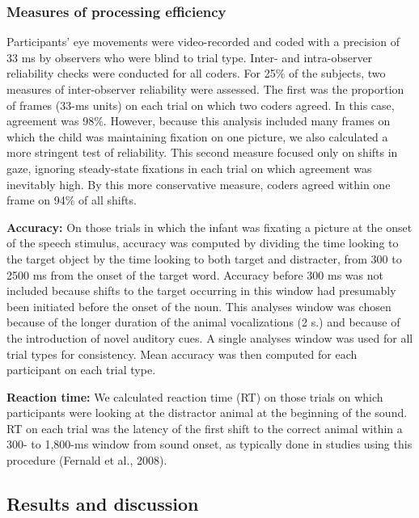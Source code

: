 \documentclass[english,floatsintext,man]{apa6}
\theoremstyle{definition}
\theoremstyle{definition}
\theoremstyle{definition}
\theoremstyle{remark}
\begin{document}
\subsubsection{Measures of processing
efficiency}\label{measures-of-processing-efficiency}

Participants' eye movements were video-recorded and coded with a
precision of 33 ms by observers who were blind to trial type. Inter- and
intra-observer reliability checks were conducted for all coders. For
25\% of the subjects, two measures of inter-observer reliability were
assessed. The first was the proportion of frames (33-ms units) on each
trial on which two coders agreed. In this case, agreement was 98\%.
However, because this analysis included many frames on which the child
was maintaining fixation on one picture, we also calculated a more
stringent test of reliability. This second measure focused only on
shifts in gaze, ignoring steady-state fixations in each trial on which
agreement was inevitably high. By this more conservative measure, coders
agreed within one frame on 94\% of all shifts.

\textbf{Accuracy:} On those trials in which the infant was fixating a
picture at the onset of the speech stimulus, accuracy was computed by
dividing the time looking to the target object by the time looking to
both target and distracter, from 300 to 2500 ms from the onset of the
target word. Accuracy before 300 ms was not included because shifts to
the target occurring in this window had presumably been initiated before
the onset of the noun. This analyses window was chosen because of the
longer duration of the animal vocalizations (2 s.) and because of the
introduction of novel auditory cues. A single analyses window was used
for all trial types for consistency. Mean accuracy was then computed for
each participant on each trial type.

\textbf{Reaction time:} We calculated reaction time (RT) on those trials
on which participants were looking at the distractor animal at the
beginning of the sound. RT on each trial was the latency of the first
shift to the correct animal within a 300- to 1,800-ms window from sound
onset, as typically done in studies using this procedure (Fernald et
al., 2008).

\subsection{Results and discussion}\label{results-and-discussion}
\end{document}
